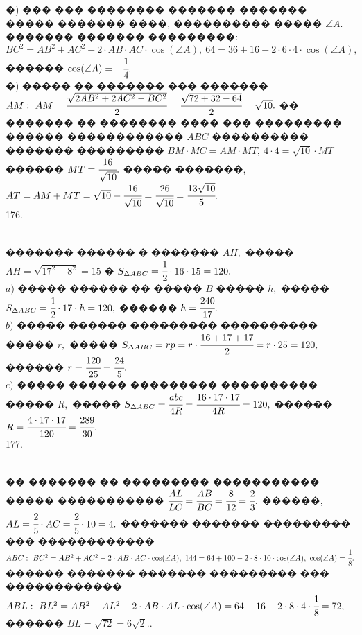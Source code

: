 \documentclass[12pt]{article}
\begin{document}
�) ��� ��� �������� ������� ������� ����� ������� ����, ���������� ����� $\angle A.$ ������� ������� ���������: $BC^2=AB^2+AC^2-2\cdot AB\cdot AC\cdot \cos(\angle A),\ 64=36+16-2\cdot6\cdot4\cdot \cos(\angle A),$ ������ $\cos(\angle A)=-\cfrac{1}{4}.$\\
�) ����� �� ������� ��� ������� $AM:\ AM=\cfrac{\sqrt{2AB^2+2AC^2-BC^2}}{2}=\cfrac{\sqrt{72+32-64}}{2}=\sqrt{10}.$ �� ������� �� �������� ���� ��� ��������� ������ ������������ $ABC$ ���������� ������� ��������� $BM\cdot MC= AM\cdot MT,\ 4\cdot4=\sqrt{10}\cdot MT$ ������ $MT=\cfrac{16}{\sqrt{10}}.$ ����� �������,
$AT=AM+MT=\sqrt{10}+\cfrac{16}{\sqrt{10}}=\cfrac{26}{\sqrt{10}}=\cfrac{13\sqrt{10}}{5}.$\\
176. \begin{figure}[ht!]
\end{figure}\\
������� ������ � ������� $AH,$ ����� $AH=\sqrt{17^2-8^2}=15$ � $S_{\Delta ABC}=\cfrac{1}{2}\cdot16\cdot15=120.$\\
$a)$ ����� ������ �� ����� $B$ ����� $h,$ ����� $S_{\Delta ABC}=\cfrac{1}{2}\cdot17\cdot h=120,$ ������ $h=\cfrac{240}{17}.$\\
$b)$ ����� ������ ��������� ���������� ����� $r,$ ����� $S_{\Delta ABC}=rp=r\cdot\cfrac{16+17+17}{2}=r\cdot25=120,$ ������ $r=\cfrac{120}{25}=\cfrac{24}{5}.$\\
$c)$ ����� ������ ��������� ���������� ����� $R,$ ����� $S_{\Delta ABC}=\cfrac{abc}{4R}=\cfrac{16\cdot17\cdot17}{4R}=120,$ ������ $R=\cfrac{4\cdot17\cdot17}{120}=\cfrac{289}{30}.$\\
177. \begin{figure}[ht!]
\end{figure}\\
�� ������� �� ��������� ����������� ����� ����������� $\cfrac{AL}{LC}=\cfrac{AB}{BC}=\cfrac{8}{12}=\cfrac{2}{3}.$ ������, $AL=\cfrac{2}{5}\cdot AC=\cfrac{2}{5}\cdot10=4.$ ������� ������� ��������� ��� ������������ $ABC:\ BC^2=AB^2+AC^2-2\cdot AB\cdot AC\cdot \cos(\angle A),\ 144=64+100-2\cdot8\cdot10\cdot
\cos(\angle A),\ \cos(\angle A)=\cfrac{1}{8}.$ ������ ������� ������� ��������� ��� ������������ $ABL:\ BL^2=AB^2+AL^2-2\cdot AB\cdot AL\cdot \cos(\angle A)=
64+16-2\cdot8\cdot4\cdot\cfrac{1}{8}=72,$ ������ $BL=\sqrt{72}=6\sqrt{2}.$\newpage{}. \begin{figure}[ht!]
\end{figure}\\
\end{document}
